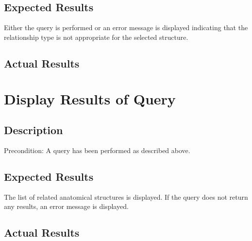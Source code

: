 \documentclass{article}
\begin{document}
\subsection{Expected Results}
Either the query is performed or an error message is displayed indicating that the relationship type is not appropriate for the selected structure.
\subsection{Actual Results}

\section{Display Results of Query}
\subsection{Description}
Precondition: A query has been performed as described above.
\subsection{Expected Results}
The list of related anatomical structures is displayed. If the query does not return any results, an error message is displayed.
\subsection{Actual Results}
\end{document}
